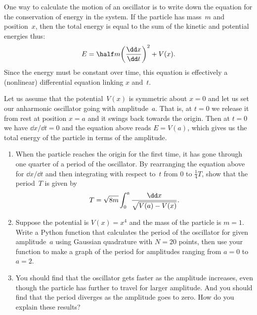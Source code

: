 \documentclass[12pt]{article}
\begin{document}
\begin{exercises}
One way to calculate the motion of an oscillator is to write down the
equation for the conservation of energy in the system.  If the particle has
mass~$m$ and position~$x$, then the total energy is equal to the sum of the
kinetic and potential energies thus:
\begin{displaymath}
E = \half m \biggl( {\dd x\over\dd t} \biggr)^2 + V(x).
\end{displaymath}
Since the energy must be constant over time, this equation is effectively a
(nonlinear) differential equation linking $x$ and~$t$.

Let us assume that the potential~$V(x)$ is symmetric about $x=0$ and let us
set our anharmonic oscillator going with amplitude~$a$.  That is, at $t=0$
we release it from rest at position $x=a$ and it swings back towards the
origin.  Then at $t=0$ we have $\dd x/\dd t = 0$ and the equation above
reads $E = V(a)$, which gives us the total energy of the particle in terms
of the amplitude.
\begin{enumerate}\setlength{\itemsep}{0pt}
\item When the particle reaches the origin for the first time, it has gone
  through one quarter of a period of the oscillator.  By rearranging the
  equation above for $\dd x/\dd t$ and then integrating with respect to~$t$
  from 0 to $\frac14 T$, show that the period~$T$ is given by
\begin{displaymath}
T = \sqrt{8m} \int_0^a {\dd x\over\sqrt{V(a)-V(x)}}.
\end{displaymath}
\item Suppose the potential is $V(x)=x^4$ and the mass of the particle is
  $m=1$.  Write a Python function that calculates the period of the
  oscillator for given amplitude~$a$ using Gaussian quadrature with $N=20$
  points, then use your function to make a graph of the period for
  amplitudes ranging from $a=0$ to $a=2$.
\item You should find that the oscillator gets faster as the amplitude
  increases, even though the particle has further to travel for larger
  amplitude.  And you should find that the period diverges as the amplitude
  goes to zero.  How do you explain these results?
\end{enumerate}




\end{exercises}
\end{document}
